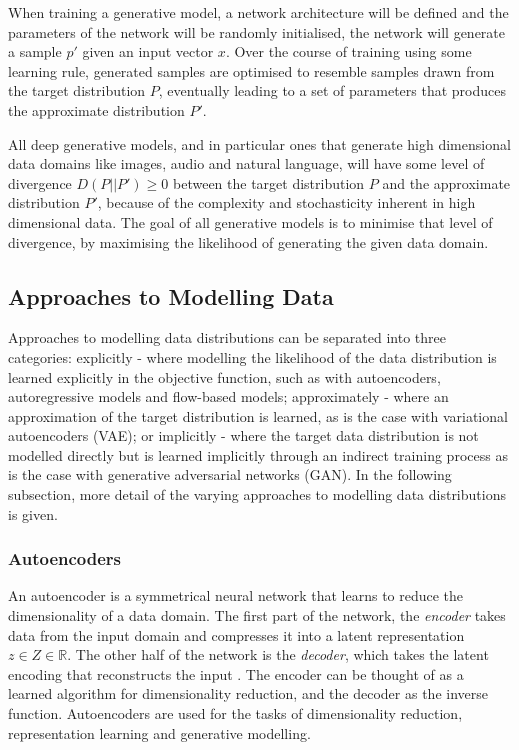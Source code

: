 When training a generative model, a network architecture will be defined and the parameters of the network will be randomly initialised, the network will generate a sample $p'$ given an input vector $x$. 
Over the course of training using some learning rule, generated samples are optimised to resemble samples drawn from the target distribution $P$, eventually leading to a set of parameters that produces the approximate distribution $P'$.

All deep generative models, and in particular ones that generate high dimensional data domains like images, audio and natural language, will have some level of divergence $D(P||P') \geq 0$ between the target distribution $P$ and the approximate distribution $P'$, because of the complexity and stochasticity inherent in high dimensional data. 
The goal of all generative models is to minimise that level of divergence, by maximising the likelihood of generating the given data domain.

\subsection{Approaches to Modelling Data}

Approaches to modelling data distributions can be separated into three categories: explicitly - where modelling the likelihood of the data distribution is learned explicitly in the objective function, such as with autoencoders, autoregressive models and flow-based models; approximately - where an approximation of the target distribution is learned, as is the case with variational autoencoders (VAE); or implicitly - where the target data distribution is not modelled directly but is learned implicitly through an indirect training process as is the case with generative adversarial networks (GAN).
In the following subsection, more detail of the varying approaches to modelling data distributions is given. 

\subsubsection{Autoencoders}

An autoencoder is a symmetrical neural network that learns to reduce the dimensionality of a data domain. 
The first part of the network, the \textit{encoder} takes data from the input domain and compresses it into a latent representation $z \in Z \in \mathbb{R}$. 
The other half of the network is the \textit{decoder}, which takes the latent encoding that reconstructs the input \citep{kramer1991nonlinear}. 
The encoder can be thought of as a learned algorithm for dimensionality reduction, and the decoder as the inverse function. 
Autoencoders are used for the tasks of dimensionality reduction, representation learning and generative modelling.

